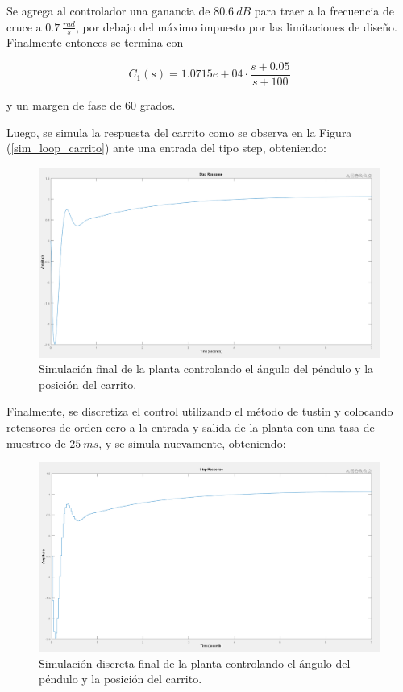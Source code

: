 Se agrega al controlador una ganancia de $80.6 \ dB$ para traer a la frecuencia de cruce a $0.7 \ \frac{rad}{s}$, por debajo del máximo impuesto por las limitaciones de diseño. Finalmente entonces se termina con

\begin{equation}
C_1(s) = 1.0715e+04 \cdot \frac{s+0.05}{s+100}
\end{equation}

y un margen de fase de $60$ grados.

Luego, se simula la respuesta del carrito como se observa en la Figura (\ref{sim_loop_carrito}) ante una entrada del tipo step, obteniendo:

\begin{figure}[H]
	\centering
	\includegraphics[width=0.8\linewidth]{Imagenes/loopshaping/simulacion_final}
	\caption{Simulación final de la planta controlando el ángulo del péndulo y la posición del carrito.}
	\label{simulacion_solo_angulo}
\end{figure}

Finalmente, se discretiza el control utilizando el método de tustin y colocando retensores de orden cero a la entrada y salida de la planta con una tasa de muestreo de $25 \ ms$, y se simula nuevamente, obteniendo:

 \begin{figure}[H]
	\centering
	\includegraphics[width=0.8\linewidth]{Imagenes/loopshaping/simulacion_final_disc}
	\caption{Simulación discreta final de la planta controlando el ángulo del péndulo y la posición del carrito.}
	\label{simulacion_solo_angulo_disc}
\end{figure}


